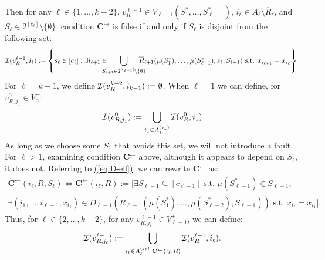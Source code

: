 \documentclass{theoretics}
\newcommand{\eq}[1]{\hyperref[eq:#1]{(\ref*{eq:#1})}}
\renewcommand{\>}{\rangle}
\newcommand{\<}{\langle}
\renewcommand{\(}{\left(}
\renewcommand{\)}{\right)}
\begin{document}
Then for any $\ell\in \{1,\dots,k-2\}$, $v_R^{\ell-1}\in V_{\ell-1}(S_1^*,\dots,S_{\ell-1}^*)$, $i_{\ell}\in A_{\ell}\setminus\overline{R}_{\ell}$, and $S_{\ell}\in 2^{[c_{\ell}]}\setminus\{\emptyset\}$, condition $\mathbf{C}^{\rightarrow}$ is false if and only if $S_{\ell}$ is disjoint from the following set:
\begin{equation}
{\cal I}(v^{\ell-1}_R,i_{\ell}):=\left\{s_{\ell}\in [c_{\ell}]: \exists i_{\ell+1}\in\!\!\!\!\!\! \bigcup_{S_{\ell+1}\in 2^{[c_{\ell+1}]}\setminus\{\emptyset\}}\!\!\!\!\!\!\!\overline{R}_{\ell+1}(\mu(S_1^*),\dots,\mu(S_{\ell-1}^*),s_{\ell},S_{\ell+1})\mbox{ s.t. }x_{i_{\ell+1}}=x_{i_{\ell}}\right\}.\label{eq:k-dist-I-i}
\end{equation}
For $\ell=k-1$, we define ${\cal I}(v^{k-2}_R,i_{k-1}):=\emptyset$. When $\ell=1$ we can define, for $v_{R,j_1}^0\in V_0^+$:
\begin{equation}
	{\cal I}(v^{0}_{R,j_{1}}):=\bigcup_{i_{1}\in A_{1}^{(j_{1})}}{\cal I}(v^{0}_R,i_{1})\label{eq:k-dist-cal-I-1}
\end{equation}
As long as we choose some $S_1$ that avoids this set, we will not introduce a fault. For $\ell>1$,
examining condition \textbf{C}$^{\leftarrow}$ above, although it appears to depend on $S_{\ell}$, it does not. Referring to \eq{D-ell}, we can rewrite \textbf{C}$^{\leftarrow}$ as:
\begin{multline*}
\mathbf{C}^{\leftarrow}(i_{\ell},R,S_{\ell})\Leftrightarrow \mathbf{C}^{\leftarrow}(i_{\ell},R):= \bigg[\exists S_{\ell-1}\subseteq [c_{\ell-1}] \mbox{ s.t. }\mu(S_{\ell-1}^*)\in S_{\ell-1},\\
\exists (i_1,\dots,i_{\ell-1},x_{i_1})\in D_{\ell-1}(R_{\ell-1}(\mu(S_1^*),\dots,\mu(S_{\ell-2}^*),S_{\ell-1}))
\mbox{ s.t. }x_{i_{\ell}}=x_{i_1}\bigg].\label{eq:k-dist-Carrow}
\end{multline*}
Thus, for $\ell\in\{2,\dots,k-2\}$, for any $v^{\ell-1}_{R,j_{\ell}}\in V_{\ell-1}^+$, we can define:
\begin{equation}
{\cal I}(v^{\ell-1}_{R,j_{\ell}}):=\bigcup_{i_{\ell}\in A_{\ell}^{(j_{\ell})}:\mathbf{C}^{\leftarrow}(i_{\ell},R)}{\cal I}(v^{\ell-1}_R,i_{\ell}).\label{eq:k-dist-cal-I}
\end{equation}
\end{document}
